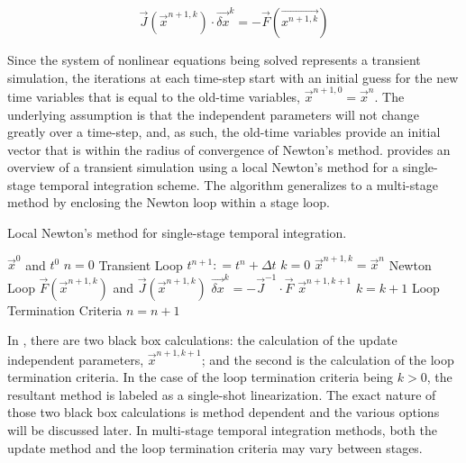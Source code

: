 \begin{equation}
\label{eqn:newton}
\vec{J}(\vec{x}^{n+1,k})\cdot \vec{\delta x}^k = -\vec{F}(\vec{x^{n+1,k}})
\end{equation} 

Since the system of nonlinear equations being solved represents a transient simulation, the iterations at each time-step start with an initial guess for the new time variables that is equal to the old-time variables, $\vec{x}^{n+1,0} = \vec{x}^{n}$.
The underlying assumption is that the independent parameters will not change greatly over a time-step, and, as such, the old-time variables provide an initial vector that is within the radius of convergence of Newton's method.
 provides an overview of a transient simulation using a local Newton's method for a single-stage temporal integration scheme.
The algorithm generalizes to a multi-stage method by enclosing the Newton loop within a stage loop.

\begin{algo}[H]
\caption{Local Newton's method for single-stage temporal integration.}
\label{alg:local_newton}
\setlength{\baselineskip}{0.625\baselineskip}
\begin{algorithmic}[1]
\Require $\vec{x}^{0}$ and $t^{0}$
\Set $n = 0$
\Loop \; Transient Loop
    \State $t^{n+1} : = t^{n} + \Delta t$
    \State $k = 0$
    \State $\vec{x}^{n+1,k} = \vec{x}^{n}$
    \Loop \; Newton Loop
		\Calculate $\vec{F}(\vec{x}^{n+1,k})$ and $\vec{J}(\vec{x}^{n+1,k})$
		\Calculate $\vec{\delta x}^k = - \vec{J}^{-1}\cdot\vec{F}$
		\BlackBox $\vec{x}^{n+1,k+1}$
		\State $k = k + 1$
		\BlackBox Loop Termination Criteria
	\EndLoop
	\State $n = n + 1$
\EndLoop
\end{algorithmic}
\end{algo}

In , there are two black box calculations: the calculation of the update independent parameters, $\vec{x}^{n+1,k+1}$; and the second is the calculation of the loop termination criteria.
In the case of the loop termination criteria being $k > 0$, the resultant method is labeled as a single-shot linearization.
The exact nature of those two black box calculations is method dependent and the various options will be discussed later.
In multi-stage temporal integration methods, both the update method and the loop termination criteria may vary between stages. 

